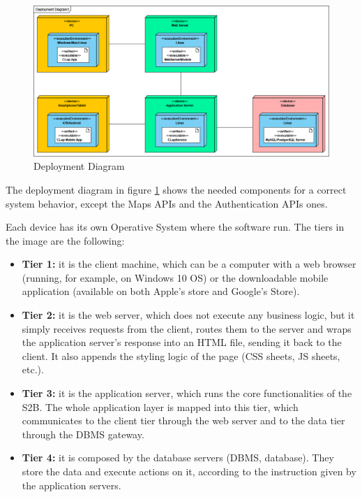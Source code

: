 \documentclass[table, 12pt]{article}
\begin{document}
\begin{figure}[H]
    \begin{center}
        \includegraphics[width=\textwidth]{assets/DeploymentDiagram/DeploymentDiagram1.png}
        \caption{Deployment Diagram}
        \label{deployment_diagram}
    \end{center}
\end{figure}

The deployment diagram in figure \ref{deployment_diagram} shows the needed components for a correct system behavior, except the Maps APIs and the Authentication APIs ones.

Each device has its own Operative System where the software run. The tiers in the image are the following:
\begin{itemize}
    \item \textbf{Tier 1:} it is the client machine, which can be a computer with a web browser (running, for example, on Windows 10 OS) or the downloadable mobile application (available on both Apple's store and Google's Store).
    \item \textbf{Tier 2:} it is the web server, which does not execute any business logic, but it simply receives requests from the client, routes them to the server and wraps the application server's response into an HTML file, sending it back to the client. It also appends the styling logic of the page (CSS sheets, JS sheets, etc.).
    \item \textbf{Tier 3:} it is the application server, which runs the core functionalities of the S2B. The whole application layer is mapped into this tier, which communicates to the client tier through the web server and to the data tier through the DBMS gateway.
    \item \textbf{Tier 4:} it is composed by the database servers (DBMS, database). They store the data and execute actions on it, according to the instruction given by the application servers.
\end{itemize}
\end{document}
